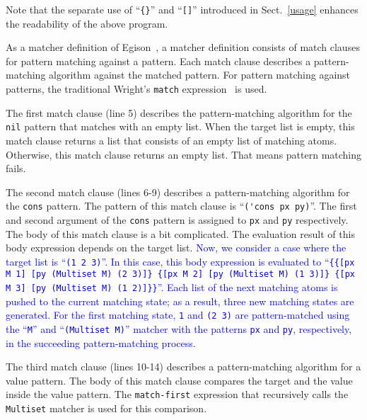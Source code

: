 \documentclass[acmlarge]{acmart}
\newcommand{\new}[1]{\textcolor{blue}{#1}}
\begin{document}
\noindent
Note that the separate use of ``\texttt{\{\}}'' and ``\lstinline{[]}'' introduced in Sect.~\ref{usage} enhances the readability of the above program.

As a matcher definition of Egison~\cite{egi2018aplas}, a matcher definition consists of match clauses for pattern matching against a pattern.
Each match clause describes a pattern-matching algorithm against the matched pattern.
For pattern matching against patterns, the traditional Wright's \lstinline{match} expression~\cite{wright1993pattern} is used.

The first match clause (line 5) describes the pattern-matching algorithm for the \lstinline{nil} pattern that matches with an empty list.
When the target list is empty, this match clause returns a list that consists of an empty list of matching atoms.
Otherwise, this match clause returns an empty list.
That means pattern matching fails.

The second match clause (lines 6-9) describes a pattern-matching algorithm for the \lstinline{cons} pattern.
The pattern of this match clause is  ``\lstinline{('cons px py)}''.
The first and second argument of the \lstinline{cons} pattern is assigned to \lstinline{px} and \lstinline{py} respectively.
The body of this match clause is a bit complicated.
The evaluation result of this body expression depends on the target list.
\new{
Now, we consider a case where the target list is ``\lstinline{(1 2 3)}''.
In this case, this body expression is evaluated to ``\texttt{\{\{[px M 1] [py (Multiset M) (2 3)]\} \{[px M 2] [py (Multiset M) (1 3)]\} \{[px M 3] [py (Multiset M) (1 2)]\}\}}''.
Each list of the next matching atoms is pushed to the current matching state; as a result, three new matching states are generated.
For the first matching state, \lstinline{1} and \lstinline{(2 3)} are pattern-matched using the ``\lstinline{M}'' and ``\lstinline{(Multiset M)}'' matcher with the patterns \lstinline{px} and \lstinline{py}, respectively, in the succeeding pattern-matching process.
}%

The third match clause (lines 10-14) describes a pattern-matching algorithm for a value pattern.
The body of this match clause compares the target and the value inside the value pattern.
The \lstinline{match-first} expression that recursively calls the \lstinline{Multiset} matcher is used for this comparison.
\end{document}
